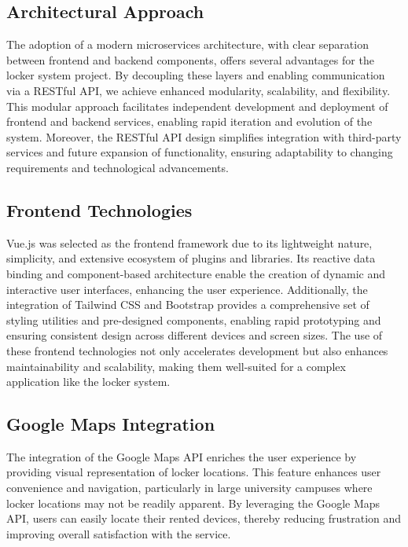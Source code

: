 \subsection{Architectural Approach}

The adoption of a modern microservices architecture, with clear separation between
frontend and backend components, offers several advantages for the locker system project.
By decoupling these layers and enabling communication via a RESTful API, we achieve enhanced
modularity, scalability, and flexibility. This modular approach facilitates
independent development and deployment of frontend and backend services, enabling
rapid iteration and evolution of the system. Moreover, the RESTful API design simplifies
integration with third-party services and future expansion of functionality, ensuring
adaptability to changing requirements and technological advancements.

\subsection{Frontend Technologies}

Vue.js was selected as the frontend framework due to its lightweight nature, simplicity,
and extensive ecosystem of plugins and libraries. Its reactive data binding and component-based
architecture enable the creation of dynamic and interactive user interfaces, enhancing
the user experience. Additionally, the integration of Tailwind CSS and Bootstrap provides
a comprehensive set of styling utilities and pre-designed components, enabling rapid
prototyping and ensuring consistent design across different devices and screen sizes.
The use of these frontend technologies not only accelerates development but also enhances
maintainability and scalability, making them well-suited for a complex application like
the locker system.

\subsection{Google Maps Integration}

The integration of the Google Maps API enriches the user experience by providing visual
representation of locker locations. This feature enhances user convenience and navigation,
particularly in large university campuses where locker locations may not be readily apparent.
By leveraging the Google Maps API, users can easily locate their rented devices, thereby
reducing frustration and improving overall satisfaction with the service.

